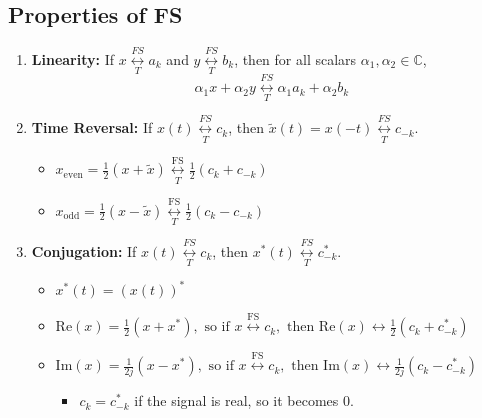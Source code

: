\subsection{Properties of FS}
\begin{definition}
    \begin{enumerate}
        \item \textbf{Linearity:} If \( x \underset{T}{\overset{FS}{\longleftrightarrow}} a_k \) and \( y \underset{T}{\overset{FS}{\longleftrightarrow}} b_k \), then for all scalars \(\alpha_1, \alpha_2 \in \mathbb{C} \),
        \[
        \alpha_1 x + \alpha_2 y \underset{T}{\overset{FS}{\longleftrightarrow}} \alpha_1 a_k + \alpha_2 b_k
        \]
    
        \item \textbf{Time Reversal:} If \( x(t) \underset{T}{\overset{FS}{\longleftrightarrow}} c_k \), then \( \tilde{x}(t) = x(-t) \underset{T}{\overset{FS}{\longleftrightarrow}} c_{-k} \).
        \begin{itemize}
            \item $x_{\text{even}} = \frac{1}{2} \left( x + \tilde{x} \right) \underset{T}{\overset{\text{FS}}{\longleftrightarrow}} \frac{1}{2} \left( c_k + c_{-k} \right)$
            \item $x_{\text{odd}} = \frac{1}{2} \left( x - \tilde{x} \right) \underset{T}{\overset{\text{FS}}{\longleftrightarrow}} \frac{1}{2} \left( c_k - c_{-k} \right)$    
        \end{itemize}
    
        \item \textbf{Conjugation:} If \( x(t) \underset{T}{\overset{FS}{\longleftrightarrow}} c_k \), then \( x^*(t) \underset{T}{\overset{FS}{\longleftrightarrow}} c_{-k}^* \).
        \begin{itemize}
            \item $x^*(t) = (x(t))^*$
        \end{itemize}
        \begin{itemize}
            \item $\text{Re}(x) = \frac{1}{2} (x + x^*), \text{ so if } x \overset{\text{FS}}{\longleftrightarrow} c_k, \text{ then } \text{Re}(x) \longleftrightarrow \frac{1}{2} (c_k + c_{-k}^*)$
            \item $\text{Im}(x) = \frac{1}{2j} (x - x^*), \text{ so if } x \overset{\text{FS}}{\longleftrightarrow} c_k, \text{ then } \text{Im}(x) \longleftrightarrow \frac{1}{2j} (c_k - c_{-k}^*)$
            \begin{itemize}
                \item $c_k = c_{-k}^*$ if the signal is real, so it becomes $0$.
            \end{itemize}
        \end{itemize}
    

\end{enumerate}
\end{definition}
